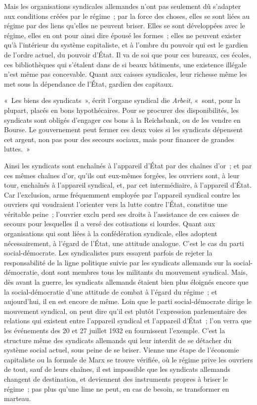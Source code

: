 \documentclass[french,twoside]{book} %
\begin{document}
Mais les organisations syndicales allemandes n'ont pas seulement dû s'adapter aux conditions créées par le régime ; par la force des choses, elles se sont liées au régime par des liens qu'elles ne peuvent briser. Elles se sont développées avec le régime, elles en ont pour ainsi dire épousé les formes ; elles ne peuvent exister qu'à l'intérieur du système capitaliste, et à l'ombre du pouvoir qui est le gardien de l'ordre actuel, du pouvoir d'État. Il va de soi que pour ces bureaux, ces écoles, ces bibliothèques qui s'étalent dans de si beaux bâtiments, une existence illégale n'est même pas concevable. Quant aux caisses syndicales, leur richesse même les met sous la dépendance de l'État, gardien des capitaux.\par
« Les biens des syndicats », écrit l'organe syndical die {\itshape Arbeit}, « sont, pour la plupart, placés en bons hypothécaires. Pour se procurer des disponibilités, les syndicats sont obligés d'engager ces bons à la Reichsbank, ou de les vendre en Bourse. Le gouvernement peut fermer ces deux voies si les syndi­cats dépensent cet argent, non pas pour des secours sociaux, mais pour financer de grandes luttes. »\par
Ainsi les syndicats sont enchaînés à l'appareil d'État par des chaînes d'or ; et par ces mêmes chaînes d'or, qu'ils ont eux-mêmes forgées, les ouvriers sont, à leur tour, enchaînés à l'appareil syndical, et, par cet intermédiaire, à l'appareil d'État. Car l'exclusion, arme fréquemment employée par l'appareil syndical contre les ouvriers qui voudraient l'orienter vers la lutte contre l'État, constitue une véritable peine ; l'ouvrier exclu perd ses droits à l'assistance de ces caisses de secours pour lesquelles il a versé des cotisations si lourdes. Quant aux organisations qui sont liées à la confédération syndicale, elles adoptent nécessairement, à l'égard de l'État, une attitude analogue. C'est le cas du parti social-démocrate. Les syndicalistes purs essayent parfois de rejeter la responsabilité de la ligne politique suivie par les syndicats allemands sur la social-démocratie, dont sont membres tous les militants du mouvement syndical. Mais, dès avant la guerre, les syndicats allemands étaient bien plus éloignés encore que la social-démocratie d'une attitude de combat à l'égard du régime ; et aujourd'hui, il en est encore de même. Loin que le parti social-démocrate dirige le mouvement syndical, on peut dire qu'il est plutôt l'expres­sion parlementaire des relations qui existent entre l'appareil syndical et l'appareil d'État ; l'on verra que les événements des 20 et 27 juillet 1932 en fournissent l'exemple. C'est la structure même des syndicats allemands qui leur interdit de se détacher du système social actuel, sous peine de se briser. Vienne une étape de l'économie capitaliste ou la formule de Marx se trouve vérifiée, où le régime prive les ouvriers de tout, sauf de leurs chaînes, il est impossible que les syndicats allemands changent de destination, et deviennent des instruments propres à briser le régime ; pas plus qu'une lime ne peut, en cas de besoin, se transformer en marteau.\par
\end{document}
